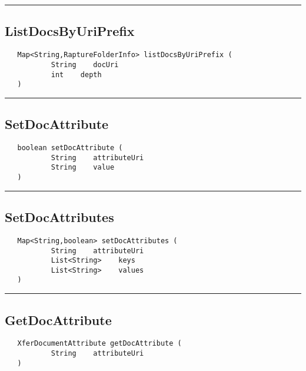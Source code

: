 \rule{15cm}{2pt}
\subsection{ListDocsByUriPrefix}
\label{Api:ListDocsByUriPrefix}
\begin{verbatim}
   Map<String,RaptureFolderInfo> listDocsByUriPrefix (
           String    docUri
           int    depth
   )
\end{verbatim}



\rule{15cm}{2pt}
\subsection{SetDocAttribute}
\label{Api:SetDocAttribute}
\begin{verbatim}
   boolean setDocAttribute (
           String    attributeUri
           String    value
   )
\end{verbatim}



\rule{15cm}{2pt}
\subsection{SetDocAttributes}
\label{Api:SetDocAttributes}
\begin{verbatim}
   Map<String,boolean> setDocAttributes (
           String    attributeUri
           List<String>    keys
           List<String>    values
   )
\end{verbatim}



\rule{15cm}{2pt}
\subsection{GetDocAttribute}
\label{Api:GetDocAttribute}
\begin{verbatim}
   XferDocumentAttribute getDocAttribute (
           String    attributeUri
   )
\end{verbatim}



